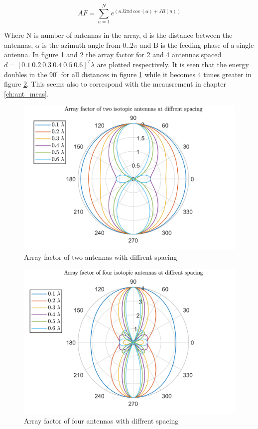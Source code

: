 \begin{equation}
AF = \sum_{n=1}^{N} e^{(n J 2\pi d \cos(\alpha)+JB(n))}
\end{equation}

Where N is number of antennas in the array, d is the distance between the antennas, $\alpha$ is the azimuth angle from $0..2\pi$ and B is the feeding phase of a single antenna. In figure \ref{fig:af_2ant} and \ref{fig:af_4ant} the array factor for 2 and 4 antennas spaced  $d = [0.1 \ 0.2 \ 0.3 \ 0.4 \ 0.5 \ 0.6]^T \lambda$ are plotted respectively. It is seen that the energy doubles in the $90^\circ$ for all distances in figure \ref{fig:af_2ant} while it becomes 4 times greater in figure \ref{fig:af_4ant}. This seems also to correspond with the meausrement in chapter \ref{ch:ant_meas}.   


\begin{figure}[H]
\centering 
\includegraphics[scale = 0.7]{figures/measurement/af_2ant.png}
\caption{Array factor of two antennas with diffrent spacing}
\label{fig:af_2ant}
\end{figure}


\begin{figure}[H]
\centering 
\includegraphics[scale = 0.7]{figures/measurement/af_4ant.png}
\caption{Array factor of four antennas with diffrent spacing}
\label{fig:af_4ant}
\end{figure}







